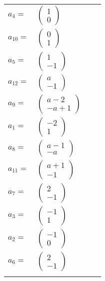 \documentclass[1p]{elsarticle_modified}
\theoremstyle{definition}
\begin{document}
\begin{tabular}{m{7pt} m{180pt} m{7pt} m{180pt} }
\flushright $a_{4}=$&$\begin{pmatrix}1\\0\end{pmatrix}$ \\
\flushright $a_{10}=$&$\begin{pmatrix}0\\1\end{pmatrix}$ \\
\flushright $a_{5}=$&$\begin{pmatrix}1\\-1\end{pmatrix}$ \\
\flushright $a_{12}=$&$\begin{pmatrix}a\\-1\end{pmatrix}$ \\
\flushright $a_{9}=$&$\begin{pmatrix}a-2\\- a+1\end{pmatrix}$ \\
\flushright $a_{1}=$&$\begin{pmatrix}-2\\1\end{pmatrix}$ \\
\flushright $a_{8}=$&$\begin{pmatrix}a-1\\- a\end{pmatrix}$ \\
\flushright $a_{11}=$&$\begin{pmatrix}a+1\\-1\end{pmatrix}$ \\
\flushright $a_{7}=$&$\begin{pmatrix}2\\-1\end{pmatrix}$ \\
\flushright $a_{3}=$&$\begin{pmatrix}-1\\1\end{pmatrix}$ \\
\flushright $a_{2}=$&$\begin{pmatrix}-1\\0\end{pmatrix}$ \\
\flushright $a_{6}=$&$\begin{pmatrix}2\\-1\end{pmatrix}$\\&\end{tabular}
\end{document}
